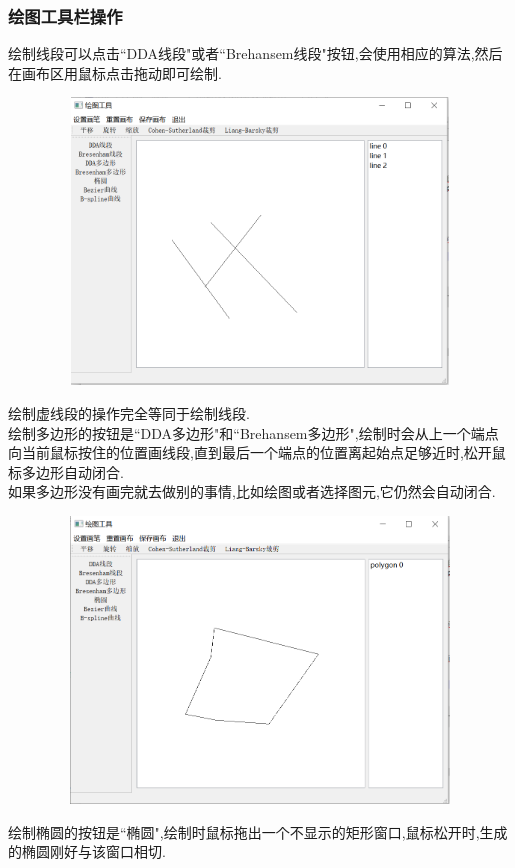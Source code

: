 \documentclass[a4paper,UTF8]{article}
\theoremstyle{definition}
\begin{document}
\subsubsection{绘图工具栏操作}
绘制线段可以点击``DDA线段"或者``Brehansem线段"按钮,会使用相应的算法,然后在画布区用鼠标点击拖动即可绘制.
\begin{figure}[H]
	\includegraphics[width=5in,height=3in]{line.png}
\end{figure}
绘制虚线段的操作完全等同于绘制线段.\\
\indent 绘制多边形的按钮是``DDA多边形"和``Brehansem多边形",绘制时会从上一个端点向当前鼠标按住的位置画线段,直到最后一个端点的位置离起始点足够近时,松开鼠标多边形自动闭合.\\
\indent 如果多边形没有画完就去做别的事情,比如绘图或者选择图元,它仍然会自动闭合.
\begin{figure}[H]
	\includegraphics[width=5in,height=3in]{polygon.png}
\end{figure}
绘制椭圆的按钮是``椭圆",绘制时鼠标拖出一个不显示的矩形窗口,鼠标松开时,生成的椭圆刚好与该窗口相切.
\end{document}
